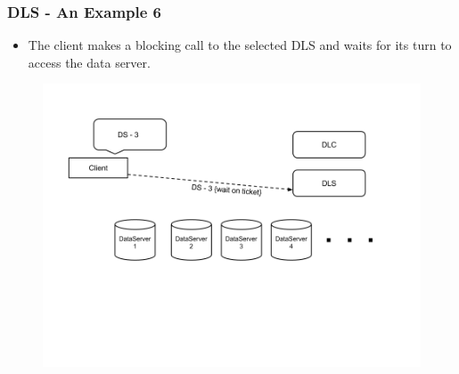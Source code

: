 \documentclass{beamer}
\begin{document}
\begin{frame}
  \frametitle{DLS - An Example 6}
  \begin{itemize}
  \item The client makes a blocking call to the selected DLS and waits for
    its turn to access the data server.
  \end{itemize}
  \begin{figure}
    \begin{center}
      \centerline{\includegraphics[scale=0.40]{img/DLS_Example7.png}}
    \end{center}
  \end{figure}

\end{frame}
\end{document}
